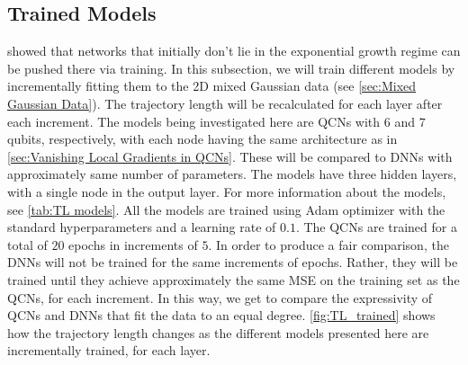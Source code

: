 \subsection{Trained Models}\label{sec:Trained Models}
\citet{raghu2017expressive} showed that networks that initially don't lie in the exponential growth regime can be pushed there via training. In this subsection, we will train different models by incrementally fitting them to the 2D mixed Gaussian data (see \cref{sec:Mixed Gaussian Data}). The trajectory length will be recalculated for each layer after each increment. The models being investigated here are  QCNs with 6 and 7 qubits, respectively, with each node having the same architecture as in \cref{sec:Vanishing Local Gradients in QCNs}. These will be compared to DNNs with approximately same number of parameters. The models have three hidden layers, with a single node in the output layer. For more information about the models, see \cref{tab:TL models}. All the models are trained using Adam optimizer with the standard hyperparameters and a learning rate of $0.1$. The QCNs are trained for a total of $20$ epochs in increments of $5$. In order to produce a fair comparison, the DNNs will not be trained for the same increments of epochs. Rather, they will be trained until they achieve approximately the same MSE on the training set as the QCNs, for each increment. In this way, we get to compare the expressivity of QCNs and DNNs that fit the data to an equal degree. \cref{fig:TL_trained} shows how the trajectory length changes as the different models presented here are incrementally trained, for each layer. 

